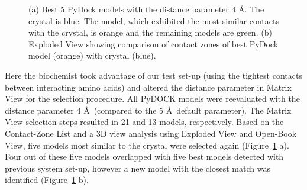 \documentclass[twocolumn]{bmcart}%
\def\OpBook {Open-Book View\xspace}
\def\ExpView {Exploded View\xspace}
\def\MatView {Matrix View\xspace}
\def\CoZoList{Contact-Zone List\xspace}
\begin{document}
\begin{figure}[htb]
    \centering 
    \vspace{-1pt}
    \vspace{-5pt}
    \caption{(a) Best 5 PyDock models with the distance parameter 4 \AA. The crystal is blue. The model, which exhibited the most similar contacts with the crystal, is orange and the remaining models are green. (b) \ExpView showing comparison of contact zones of best PyDock model (orange) with crystal (blue).}
  \label{fig:pydock_pocket_string}
\end{figure}


Here the biochemist took advantage of our test set-up (using the tightest contacts between interacting amino acids) and altered the distance parameter in \MatView for the selection procedure. 
All PyDOCK models were reevaluated with the distance parameter 4 \AA~(compared to the 5 \AA~default parameter). 
The \MatView selection steps resulted in 21 and 13 models, respectively. 
Based on the \CoZoList and a 3D view analysis using \ExpView and \OpBook, five models most similar to the crystal were selected again (Figure~\ref{fig:pydock_pocket_string} a). Four out of these five models overlapped with five best models detected with previous system set-up, however a new model with the closest match was identified (Figure~\ref{fig:pydock_pocket_string} b).
\end{document}

